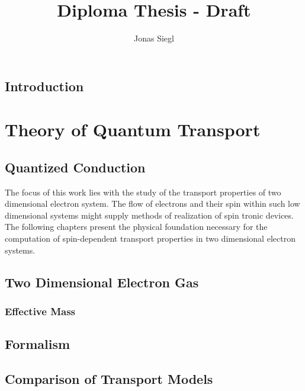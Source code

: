 
\author{Jonas Siegl}
\title{Diploma Thesis - Draft}




\maketitle
% 

\thispagestyle{plain} %
\tableofcontents
\clearpage
\section{Introduction}
\clearpage
\chapter{Theory of Quantum Transport}
  \section{Quantized Conduction}
  
The focus of this work lies with the study of the transport properties of two dimensional electron system. The flow of electrons and their spin within such low dimensional systems might supply methods of realization of spin tronic devices.
 The following chapters present the physical foundation necessary for the computation of spin-dependent transport properties in two dimensional electron systems.
  \section{Two Dimensional Electron Gas}
    
      \subsection{Effective Mass \hamil{}}
	
	
  \section{\cgfnc{} Formalism}
  
  \section{Comparison of Transport Models}
  
